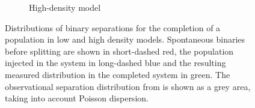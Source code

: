 \begin{figure}
\begin{subfigure}[b]{0.49\textwidth}
        \caption{High-density model}
        \label{Fig:5_completed_smaxis_HD}
    \end{subfigure}
\caption{Distributions of binary separations for the completion of a population in low and high density models. Spontaneous binaries before splitting are shown in short-dashed red, the population injected in the system in long-dashed blue and the resulting measured distribution in the completed system in green. The observational separation distribution from \protect\cite{Raghavan2010} is shown as a grey area, taking into account Poisson dispersion.}
\label{Fig:5_completed_smaxis}
\end{figure}

